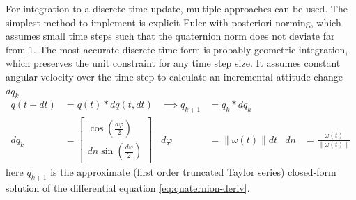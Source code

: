For integration to a discrete time update, multiple approaches can be used. 
The simplest method to implement is explicit Euler with posteriori norming, which assumes small time steps such that the quaternion norm does not deviate far from 1.
The most accurate discrete time form is probably geometric integration, which preserves the unit constraint for any time step size. It assumes constant angular velocity over the time step to calculate an incremental attitude change $dq_k$ \cite{sola2017} 
\begin{align}
    q(t + dt) &= q(t) * dq(t,dt) 
    &\implies
    q_{k+1} &= q_k * dq_k \\
    dq_k &= \begin{bmatrix} \cos(\frac{d\varphi}{2}) \\ dn \sin(\frac{d\varphi}{2})
    \end{bmatrix}
    & d\varphi &= \lVert \omega(t) \rVert dt 
    & dn &= \frac{\omega(t)}{\lVert \omega(t) \rVert}
    \label{eq:quaternion-increment}
\end{align}
here $q_{k+1}$ is the approximate (first order truncated Taylor series) closed-form solution of the differential equation \ref{eq:quaternion-deriv}.





